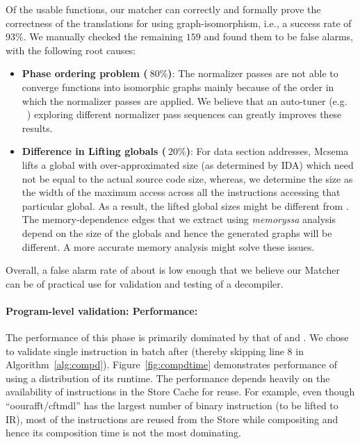 Of the \plvT usable functions, our matcher can correctly and formally 
prove the correctness of the translations for \plvP using graph-isomorphism, 
i.e., a success rate of 93\%.
We manually checked the remaining $159$ and found them to be false alarms, with the
following root causes:

\begin{itemize}
 \item \textbf{Phase ordering problem ($~80\%$)}: The normalizer passes are not able to
converge functions into isomorphic graphs mainly because of the order in which
the normalizer passes are applied. We believe that an auto-tuner
(e.g. ~\cite{opentuner2014,HyperOpt13}) exploring
different normalizer pass sequences can greatly improves these results.

 \item \textbf{Difference in Lifting globals ($~20\%$)}: For data section addresses, Mcsema
lifts a global with over-approximated size (as determined by IDA) which need
not be equal to the actual source code size, whereas, we determine the size as
the width of the maximum access across all the instructions accessing that
particular global.  As a result, the lifted global sizes might be different from
\mcsema. The memory-dependence edges that we extract using \LLVM \textit{memoryssa}
analysis depend on the size of the globals and hence the generated graphs will
be different. A more accurate memory analysis might solve these issues.
    
\end{itemize}


Overall, a false alarm rate of about \FPRate is low enough that we believe
our Matcher can be of practical use for validation and testing of a decompiler.


\paragraph{Program-level validation: Performance:}
The performance of this phase is primarily dominated by that of \compd and
\matcher.  We chose to validate single instruction in batch after \plv (thereby
 skipping line 8 in Algorithm~\ref{alg:compd}). Figure~\ref{fig:compdtime} demonstrates
 performance of \compd using a distribution of its runtime. The
 performance depends heavily on the availability of instructions in the Store
 Cache for reuse. For example, even though   ``oourafft/cftmdl'' has the largest number of
 binary instruction (to be lifted to IR), most of the instructions are reused from the
 Store while compositing and hence its composition time is not the most dominating.
 
